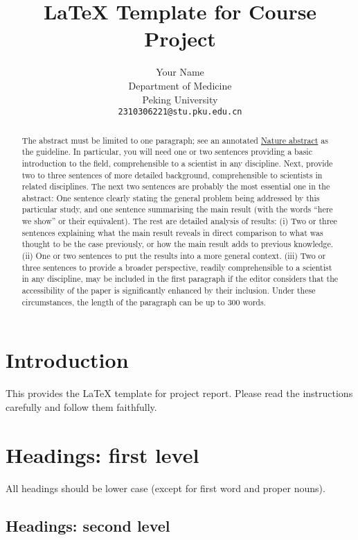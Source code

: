 \documentclass{article}
\title{\LaTeX{} Template for Course Project}
\author{%
  Your Name \\
  Department of Medicine\\
  Peking University\\
  \texttt{2310306221@stu.pku.edu.cn} \\
}
\begin{document}
\maketitle

\begin{abstract}
The abstract must be limited to one paragraph; see an annotated \href{https://cbs.umn.edu/sites/cbs.umn.edu/files/public/downloads/Annotated_Nature_abstract.pdf}{Nature abstract} as the guideline. In particular, you will need one or two sentences providing a basic introduction to the field, comprehensible to a scientist in any discipline. Next, provide two to three sentences of more detailed background, comprehensible to scientists in related disciplines. The next two sentences are probably the most essential one in the abstract: One sentence clearly stating the general problem being addressed by this particular study, and one sentence summarising the main result (with the words ``here we show'' or their equivalent). The rest are detailed analysis of results: (i) Two or three sentences explaining what the main result reveals in direct comparison to what was thought to be the case previously, or how the main result adds to previous knowledge. (ii) One or two sentences to put the results into a more general context. (iii) Two or three sentences to provide a broader perspective, readily comprehensible to a scientist in any discipline, may be included in the first paragraph if the editor considers that the accessibility of the paper is significantly enhanced by their inclusion. Under these circumstances, the length of the paragraph can be up to 300 words.
\end{abstract}


\section{Introduction}
\label{sec:introduction}


This provides the \LaTeX{} template for project report. Please read the instructions carefully and follow them faithfully.

\section{Headings: first level}\label{sec:headings}

All headings should be lower case (except for first word and proper nouns).

\subsection{Headings: second level}
\end{document}

